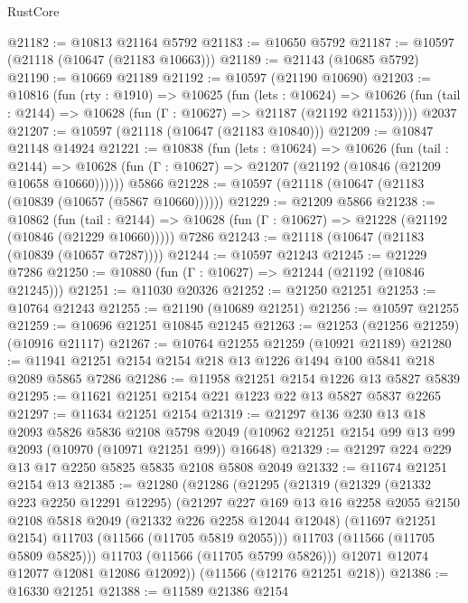 \begin{lexlean}{RustCore}
\begin{coremodule}
@21182 := @10813 @21164 @5792
@21183 := @10650 @5792
@21187 := @10597 (@21118 (@10647 (@21183 @10663)))
@21189 := @21143 (@10685 @5792)
@21190 := @10669 @21189
@21192 := @10597 (@21190 @10690)
@21203 := @10816
    (fun (rty : @1910) =>
    @10625
      (fun (lets : @10624) =>
      @10626 (fun (tail : @2144) => @10628 (fun (Γ : @10627) => @21187 (@21192 @21153)))))
    @2037
@21207 := @10597 (@21118 (@10647 (@21183 @10840)))
@21209 := @10847 @21148 @14924
@21221 := @10838
    (fun (lets : @10624) =>
    @10626
      (fun (tail : @2144) =>
      @10628 (fun (Γ : @10627) => @21207 (@21192 (@10846 (@21209 @10658 @10660))))))
    @5866
@21228 := @10597 (@21118 (@10647 (@21183 (@10839 (@10657 (@5867 @10660))))))
@21229 := @21209 @5866
@21238 := @10862
    (fun (tail : @2144) => @10628 (fun (Γ : @10627) => @21228 (@21192 (@10846 (@21229 @10660)))))
    @7286
@21243 := @21118 (@10647 (@21183 (@10839 (@10657 @7287))))
@21244 := @10597 @21243
@21245 := @21229 @7286
@21250 := @10880 (fun (Γ : @10627) => @21244 (@21192 (@10846 @21245)))
@21251 := @11030 @20326
@21252 := @21250 @21251
@21253 := @10764 @21243
@21255 := @21190 (@10689 @21251)
@21256 := @10597 @21255
@21259 := @10696 @21251 @10845 @21245
@21263 := @21253 (@21256 @21259) (@10916 @21117)
@21267 := @10764 @21255 @21259 (@10921 @21189)
@21280 := @11941 @21251 @2154 @2154 @218 @13 @1226 @1494 @100 @5841 @218 @2089 @5865 @7286
@21286 := @11958 @21251 @2154 @1226 @13 @5827 @5839
@21295 := @11621 @21251 @2154 @221 @1223 @22 @13 @5827 @5837 @2265
@21297 := @11634 @21251 @2154
@21319 := @21297
    @136
    @230
    @13
    @18
    @2093
    @5826
    @5836
    @2108
    @5798
    @2049
    (@10962 @21251 @2154 @99 @13 @99 @2093 (@10970 (@10971 @21251 @99)) @16648)
@21329 := @21297 @224 @229 @13 @17 @2250 @5825 @5835 @2108 @5808 @2049
@21332 := @11674 @21251 @2154 @13
@21385 := @21280
    (@21286
      (@21295
        (@21319
          (@21329
            (@21332 @223 @2250 @12291 @12295)
            (@21297
              @227
              @169
              @13
              @16
              @2258
              @2055
              @2150
              @2108
              @5818
              @2049
              (@21332 @226 @2258 @12044 @12048)
              (@11697 @21251 @2154)
              @11703
              (@11566 (@11705 @5819 @2055)))
            @11703
            (@11566 (@11705 @5809 @5825)))
          @11703
          (@11566 (@11705 @5799 @5826)))
        @12071
        @12074
        @12077
        @12081
        @12086
        @12092))
    (@11566 (@12176 @21251 @218))
@21386 := @16330 @21251
@21388 := @11589 @21386 @2154

\end{coremodule}
\end{lexlean}
